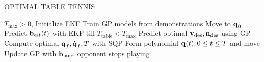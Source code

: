 \begin{algorithm}[tb]
   \caption{OPTIMAL TABLE TENNIS}
   \label{alg1}
\begin{algorithmic}
    $T_{\mathrm{max}} > 0$, 
   \STATE Initialize EKF
   \STATE Train GP models from demonstrations
   \STATE Move to $\boldsymbol{\mathrm{q}}_0$
   \REPEAT 
	   \STATE Predict $\boldsymbol{\mathrm{b}}_{\mathrm{est}}(t)$ with EKF till $T_{\mathrm{table}} < T_{\mathrm{max}}$
	   \STATE Predict optimal $\boldsymbol{\mathrm{v}}_{\mathrm{des}}, \boldsymbol{\mathrm{n}}_{\mathrm{des}}$ using GP
	   \STATE Compute optimal $\boldsymbol{\mathrm{q}}_f, \dot{\boldsymbol{\mathrm{q}}}_f, T$ with SQP
	   \STATE Form polynomial $\boldsymbol{\mathrm{q}}(t), 0 \leq t \leq T$ and move
	   \STATE Update GP with $\boldsymbol{\mathrm{b}}_{\mathrm{land}}$	
   \UNTIL opponent stops playing
\end{algorithmic}
\end{algorithm}